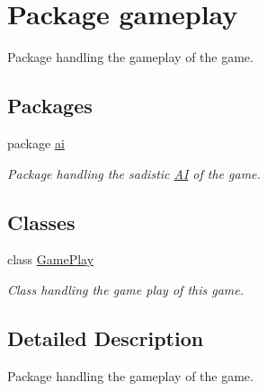 \hypertarget{a00081}{\section{Package gameplay}
\label{a00081}
}


Package handling the gameplay of the game.  


\subsection*{Packages}
\begin{DoxyCompactItemize}
\item 
package \hyperlink{a00082}{ai}
\begin{DoxyCompactList}\small\item\em Package handling the sadistic \hyperlink{a00001}{A\-I} of the game. \end{DoxyCompactList}\end{DoxyCompactItemize}
\subsection*{Classes}
\begin{DoxyCompactItemize}
\item 
class \hyperlink{a00010}{Game\-Play}
\begin{DoxyCompactList}\small\item\em Class handling the game play of this game. \end{DoxyCompactList}\end{DoxyCompactItemize}


\subsection{Detailed Description}
Package handling the gameplay of the game. 